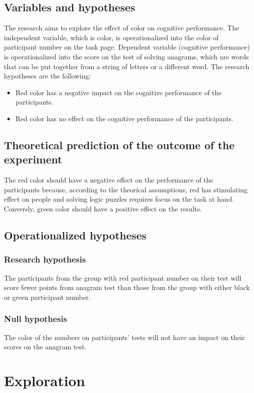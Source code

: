 \documentclass[12pt, a4]{article}
\begin{document}
\subsection*{Variables and hypotheses}
The research aims to explore the effect of color on cognitive performance. The independent variable, which is color, is operationalized into the color of participant number
on the task page. Dependent variable (cognitive performance) is operationalized into the score on the test of solving anagrams, which are words that can be put together from
a string of letters or a different word. The research hypotheses are the following:
\begin{itemize}
    \item Red color has a negative impact on the cognitive performance of the participants.
    \item Red color has no effect on the cognitive performance of the participants.
\end{itemize}

\subsection*{Theoretical prediction of the outcome of the experiment}
The red color should have a negative effect on the performance of the participants because, according to the theorical assumptions, red has stimulating effect on people and 
solving logic puzzles requires focus on the task at hand. Conversly, green color should have a positive effect on the results.

\subsection*{Operationalized hypotheses}
\subsubsection*{Research hypothesis}
The participants from the group with red participant number on their test will score fewer points from anagram test than those from the group with either black or green 
participant number.
\subsubsection*{Null hypothesis}
The color of the numbers on participants' tests will not have an impact on their scores on the anagram test.

\section*{Exploration}
\end{document}
